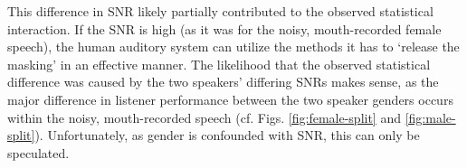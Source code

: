 This difference in SNR likely partially contributed to the observed statistical interaction.  If the SNR is high (as it was for the noisy, mouth-recorded female speech), the human auditory system can utilize the methods it has to `release the masking' in an effective manner.  The likelihood that the observed statistical difference was caused by the two speakers' differing SNRs makes sense, as the major difference in listener performance between the two speaker genders occurs within the noisy, mouth-recorded speech (cf. Figs. \ref{fig:female-split} and \ref{fig:male-split}).  \DIFaddbegin {}\DIFaddend Unfortunately, as gender is confounded with SNR, this can only be speculated.




